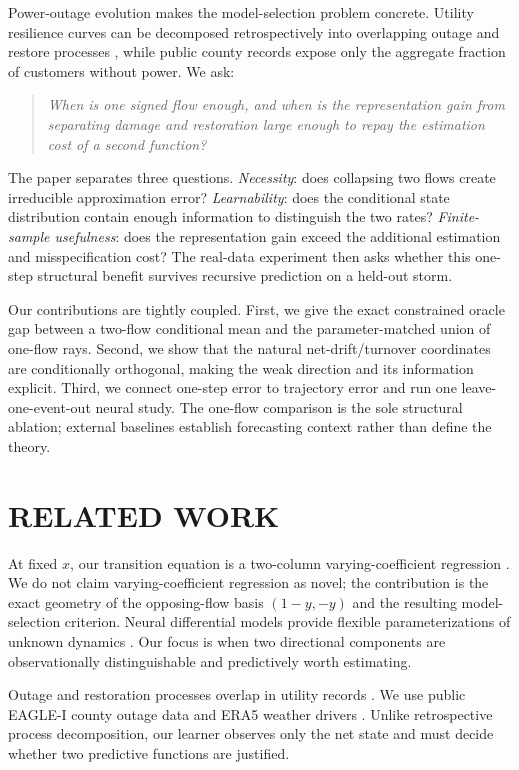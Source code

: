 \documentclass[twoside]{article}
\theoremstyle{plain}
\theoremstyle{definition}
\theoremstyle{remark}
\begin{document}
Power-outage evolution makes the model-selection problem concrete. Utility
resilience curves can be decomposed retrospectively into overlapping outage and
restore processes \citep{carrington2021}, while public county records expose
only the aggregate fraction of customers without power. We ask:
\begin{quote}
\emph{When is one signed flow enough, and when is the representation gain from
separating damage and restoration large enough to repay the estimation cost of
a second function?}
\end{quote}

The paper separates three questions. \emph{Necessity}: does collapsing two
flows create irreducible approximation error? \emph{Learnability}: does the
conditional state distribution contain enough information to distinguish the
two rates? \emph{Finite-sample usefulness}: does the representation gain exceed
the additional estimation and misspecification cost? The real-data experiment
then asks whether this one-step structural benefit survives recursive
prediction on a held-out storm.

Our contributions are tightly coupled. First, we give the exact constrained
oracle gap between a two-flow conditional mean and the parameter-matched union
of one-flow rays. Second, we show that the natural net-drift/turnover
coordinates are conditionally orthogonal, making the weak direction and its
information explicit. Third, we connect one-step error to trajectory error and
run one leave-one-event-out neural study. The one-flow comparison is the sole
structural ablation; external baselines establish forecasting context rather
than define the theory.

\section{RELATED WORK}

At fixed \(x\), our transition equation is a two-column varying-coefficient
regression \citep{hastie1993}. We do not claim varying-coefficient regression as
novel; the contribution is the exact geometry of the opposing-flow basis
\((1-y,-y)\) and the resulting model-selection criterion. Neural differential
models provide flexible parameterizations of unknown dynamics
\citep{chen2018}. Our focus is when two directional components are
observationally distinguishable and predictively worth estimating.

Outage and restoration processes overlap in utility records
\citep{carrington2021}. We use public EAGLE-I county outage data
\citep{brelsford2024,tansakul2023} and ERA5 weather drivers
\citep{hersbach2020}. Unlike retrospective process decomposition, our learner
observes only the net state and must decide whether two predictive functions are
justified.
\end{document}
